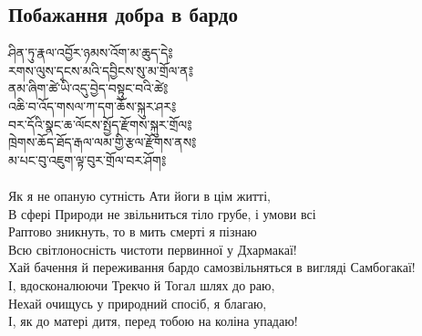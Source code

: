 \subsection{Побажання добра в бардо}
\vspace{0.5cm}
\ti
ཤིན་ཏུ་རྣལ་འབྱོར་ཉམས་འོག་མ་ཆུད་དེ༔\\
རགས་ལུས་དྭངས་མའི་དབྱིངས་སུ་མ་གྲོལ་ན༔\\
ནམ་ཞིག་ཚེ་ཡི་འདུ་བྱེད་བསྟུང་བའི་ཚེ༔\\
འཆི་བ་འོད་གསལ་ཀ་དག་ཆོས་སྐུར་ཤར༔\\
བར་དོའི་སྣང་ཆ་ལོངས་སྤྱོད་རྫོགས་སྐུར་གྲོལ༔\\
ཁྲེགས་ཆོད་ཐོད་རྒལ་ལམ་གྱི་རྩལ་རྫོགས་ནས༔\\
མ་པང་བུ་འཇུག་ལྟ་བུར་གྲོལ་བར་ཤོག༔\\
\\
\ru
Як я не опаную сутність Ати йоги в цім житті,\\
В сфері Природи не звільниться тіло грубе, і умови всі\\
Раптово зникнуть, то в мить смерті я пізнаю\\
Всю світлоносність чистоти первинної у Дхармакаї!\\
Хай бачення й переживання бардо самозвільняться в вигляді Самбогакаї!\\
І, вдосконалюючи Трекчо й Тогал шлях до раю,\\
Нехай очищусь у природний спосіб, я благаю,\\
І, як до матері дитя, перед тобою на коліна упадаю!\\

\newpage
